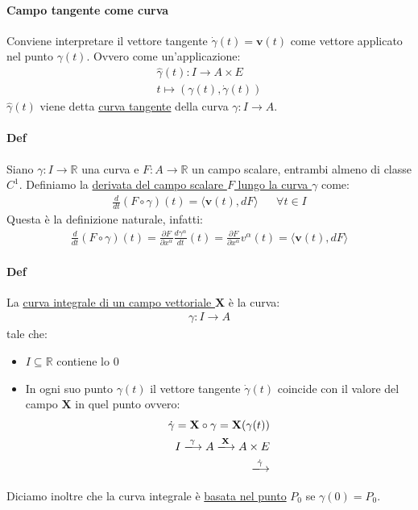 \documentclass[10pt,a4paper]{book}
\begin{document}
\paragraph{Campo tangente come curva} Conviene interpretare il vettore tangente $\dot{\gamma}(t)=\mathbf{v}(t)$ come vettore applicato nel punto $\gamma(t)$. Ovvero come un'applicazione:
\begin{align*}
    \hat{\gamma}(t)\colon I \to A\times E\\
    t\mapsto (\gamma(t),\dot{\gamma}(t))
\end{align*}
$\hat{\gamma}(t)$ viene detta \underline{curva tangente} della curva $\gamma\colon I \to A$.
\paragraph{Def} Siano $\gamma \colon I \to \mathbb{R}$ una curva e $F\colon A \to \mathbb{R}$ un campo scalare, entrambi almeno di classe $C^1$.
Definiamo la \underline{derivata del campo scalare $F$ lungo la curva $\gamma$} come:
\begin{align*}
    \frac{d}{dt}(F\circ \gamma)(t)=\langle \mathbf{v}(t),dF\rangle && \forall t \in I
\end{align*}
Questa è la definizione naturale, infatti:
\begin{align*}
    \frac{d}{dt}(F\circ \gamma)(t)=\frac{\partial F}{\partial x^\alpha}\frac{d\gamma^\alpha}{dt}(t)=\frac{\partial F}{\partial x^\alpha}v^\alpha(t)=\langle\mathbf{v}(t),dF\rangle
\end{align*}
\paragraph{Def} La \underline{curva integrale di un campo vettoriale $\mathbf{X}$} è la curva:
\begin{align*}
    \gamma \colon I \to A
\end{align*}
tale che:
\begin{itemize}
    \item $I\subseteq \mathbb{R}$ contiene lo $0$
    \item In ogni suo punto $\gamma(t)$ il vettore tangente $\dot{\gamma}(t)$ coincide con il valore del campo $\mathbf{X}$ in quel punto ovvero:
    \begin{align*}
        \dot{\gamma}=\mathbf{X}\circ \gamma=\mathbf{X}(\gamma(t))\\
        I\xlongrightarrow{\gamma}A\xlongrightarrow[]{\mathbf{X}}A\times E\\
        \xlongrightarrow{\dot{\gamma}}
    \end{align*}
\end{itemize}
Diciamo inoltre che la curva integrale è \underline{basata nel punto} $P_0$ se $\gamma(0)=P_0$.
\end{document}
